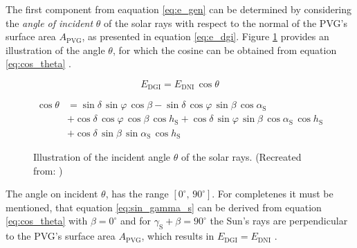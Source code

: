 The first component from eaquation \ref{eq:e_gen} can be determined by considering the \emph{angle of incident} $\theta$ of the solar rays with respect to the normal of the PVG's surface area $A_{\mathrm{PVG}}$, as presented in equation \ref{eq:e_dgi}. Figure \ref{fig:tikz_angle_theta} provides an illustration of the angle $\theta$, for which the cosine can be obtained from equation \ref{eq:cos_theta} \cite{Appelbaum:1993, Bertol:2011, Mertens:2015, Wagner:2018}.
\begin{center}
	\begin{equation} \label{eq:e_dgi}
		E_{\mathrm{DGI}} = E_{\mathrm{DNI}} \, \cos \theta
	\end{equation}
\end{center}
\begin{center}
	\begin{equation} \label{eq:cos_theta}
		\begin{aligned}
		\cos \theta &= \sin \delta \, \sin \varphi \, \cos \beta - \sin \delta \, \cos \varphi \, \sin \beta \, \cos \alpha_{\mathrm{S}} \\
		&+ \cos \delta \, \cos \varphi \, \cos \beta \, \cos h_{\mathrm{S}} + \cos \delta \, \sin \varphi \, \sin \beta \, \cos \alpha_{\mathrm{S}} \, \cos h_{\mathrm{S}} \\ &+ \cos \delta \, \sin \beta \, \sin \alpha_{\mathrm{S}} \, \cos h_{\mathrm{S}}
		\end{aligned}
	\end{equation}
\end{center}
\begin{figure}[h!]
	\centering
	
	\caption{Illustration of the incident angle $\theta$ of the solar rays. (Recreated from: \cite{Appelbaum:1993})}
	\label{fig:tikz_angle_theta}
\end{figure}
The angle on incident $\theta$, has the range $\left[0^\circ \text{, } 90^\circ\right]$. For completenes it must be mentioned, that equation \ref{eq:sin_gamma_s} can be derived from equation \ref{eq:cos_theta} with $\beta = 0^\circ$ and for $\gamma_{\mathrm{S}} + \beta = 90^\circ$ the Sun's rays are perpendicular to the PVG's surface area $A_{\mathrm{PVG}}$, which results in $E_{\mathrm{DGI}} = E_{\mathrm{DNI}}$ \cite{Appelbaum:1993, Mertens:2015, Wagner:2018}.

